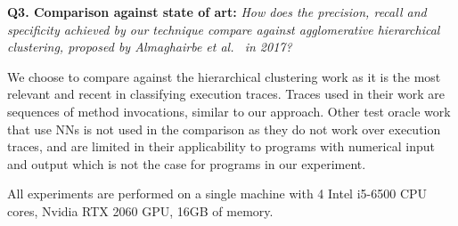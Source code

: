 \textbf{Q3. Comparison against state of art:}
\textit{How does the precision, recall and specificity achieved by our technique compare against agglomerative hierarchical clustering, proposed by Almaghairbe et al.~\cite{almaghairbe2017separating} in 2017? }

We choose to compare against the hierarchical clustering work as it is the most relevant and recent in classifying execution traces. Traces used in their work are sequences of method invocations, similar to our approach. Other test oracle work that use NNs is not used in the comparison as they do not work over execution traces, and are limited in their applicability to programs with numerical input and output which is not the case for programs in our experiment. 


All experiments are performed on a single machine with 4 Intel i5-6500 CPU cores, Nvidia RTX 2060 GPU, 16GB of memory. %


